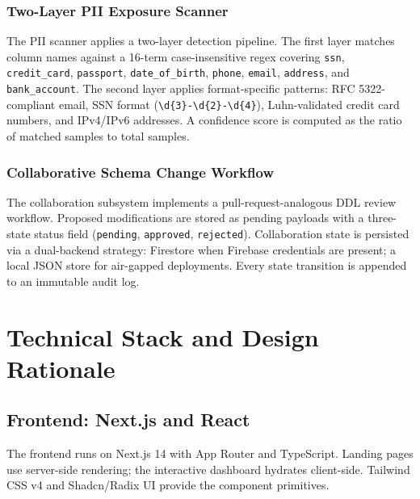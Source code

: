 \documentclass[12pt,a4paper]{report}
\begin{document}
\subsubsection{Two-Layer PII Exposure Scanner}

The PII scanner applies a two-layer detection pipeline. The first layer matches column names against a 16-term case-insensitive regex covering \texttt{ssn}, \texttt{credit\_card}, \texttt{passport}, \texttt{date\_of\_birth}, \texttt{phone}, \texttt{email}, \texttt{address}, and \texttt{bank\_account}. The second layer applies format-specific patterns: RFC 5322-compliant email, SSN format (\texttt{\textbackslash d\{3\}-\textbackslash d\{2\}-\textbackslash d\{4\}}), Luhn-validated credit card numbers, and IPv4/IPv6 addresses. A confidence score is computed as the ratio of matched samples to total samples.

\subsubsection{Collaborative Schema Change Workflow}

The collaboration subsystem implements a pull-request-analogous DDL review workflow. Proposed modifications are stored as pending payloads with a three-state status field (\texttt{pending}, \texttt{approved}, \texttt{rejected}). Collaboration state is persisted via a dual-backend strategy: Firestore when Firebase credentials are present; a local JSON store for air-gapped deployments. Every state transition is appended to an immutable audit log.

\section{Technical Stack and Design Rationale}

\subsection{Frontend: Next.js and React}

The frontend runs on Next.js 14 with App Router and TypeScript. Landing pages use server-side rendering; the interactive dashboard hydrates client-side. Tailwind CSS v4 and Shadcn/Radix UI provide the component primitives.
\end{document}
